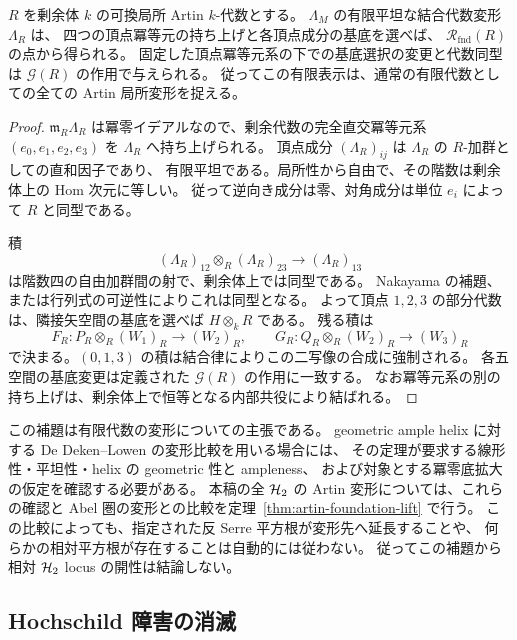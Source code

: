 \begin{lemma}
\label{lem:foundation-artin-deformation}
$R$ を剰余体 $k$ の可換局所 Artin $k$-代数とする。
$\Lambda_M$ の有限平坦な結合代数変形 $\Lambda_R$ は、
四つの頂点冪等元の持ち上げと各頂点成分の基底を選べば、
$\mathcal R_{\mathrm{fnd}}(R)$ の点から得られる。
固定した頂点冪等元系の下での基底選択の変更と代数同型は
$\mathcal G(R)$ の作用で与えられる。
従ってこの有限表示は、通常の有限代数としての全ての Artin 局所変形を捉える。
\end{lemma}
\begin{proof}
$\mathfrak m_R\Lambda_R$ は冪零イデアルなので、剰余代数の完全直交冪等元系
$(e_0,e_1,e_2,e_3)$ を $\Lambda_R$ へ持ち上げられる。
頂点成分 $(\Lambda_R)_{ij}$ は $\Lambda_R$ の $R$-加群としての直和因子であり、
有限平坦である。局所性から自由で、その階数は剰余体上の Hom 次元に等しい。
従って逆向き成分は零、対角成分は単位 $e_i$ によって $R$ と同型である。

積
\[
 (\Lambda_R)_{12}\otimes_R(\Lambda_R)_{23}
 \longrightarrow (\Lambda_R)_{13}
\]
は階数四の自由加群間の射で、剰余体上では同型である。
Nakayama の補題、または行列式の可逆性によりこれは同型となる。
よって頂点 $1,2,3$ の部分代数は、隣接矢空間の基底を選べば
$H\otimes_kR$ である。
残る積は
\[
 F_R:P_R\otimes_R(W_1)_R\longrightarrow(W_2)_R,
 \qquad
 G_R:Q_R\otimes_R(W_2)_R\longrightarrow(W_3)_R
\]
で決まる。$(0,1,3)$ の積は結合律によりこの二写像の合成に強制される。
各五空間の基底変更は定義された $\mathcal G(R)$ の作用に一致する。
なお冪等元系の別の持ち上げは、剰余体上で恒等となる内部共役により結ばれる。
\end{proof}

\begin{remark}
この補題は有限代数の変形についての主張である。
geometric ample helix に対する De Deken--Lowen
\cite[\S4.1, Theorems 4.5 and 5.15]{DeDekenLowen2011} の変形比較を用いる場合には、
その定理が要求する線形性・平坦性・helix の geometric 性と ampleness、
および対象とする冪零底拡大の仮定を確認する必要がある。
本稿の全 $\mathcal H_2$ の Artin 変形については、これらの確認と
Abel 圏の変形との比較を定理~\ref{thm:artin-foundation-lift} で行う。
この比較によっても、指定された反 Serre 平方根が変形先へ延長することや、
何らかの相対平方根が存在することは自動的には従わない。
従ってこの補題から相対 $\mathcal H_2$ locus の開性は結論しない。
\end{remark}

\subsection{Hochschild 障害の消滅}

